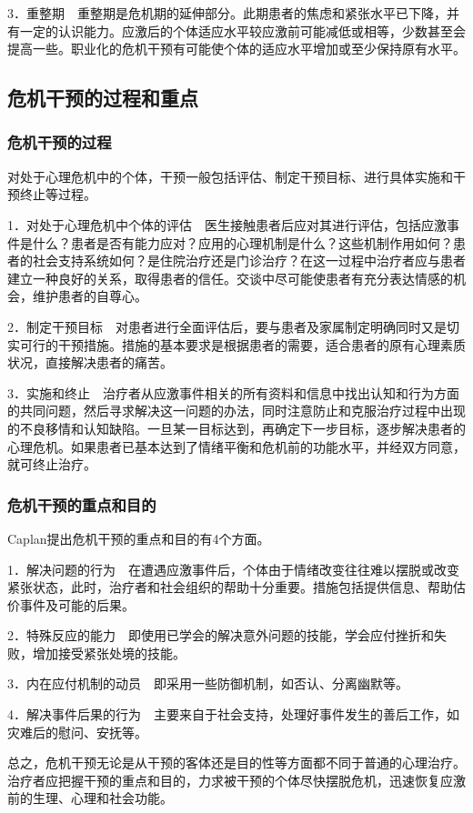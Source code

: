3．重整期　重整期是危机期的延伸部分。此期患者的焦虑和紧张水平已下降，并有一定的认识能力。应激后的个体适应水平较应激前可能减低或相等，少数甚至会提高一些。职业化的危机干预有可能使个体的适应水平增加或至少保持原有水平。

\subsection{危机干预的过程和重点}

\subsubsection{危机干预的过程}

对处于心理危机中的个体，干预一般包括评估、制定干预目标、进行具体实施和干预终止等过程。

1．对处于心理危机中个体的评估　医生接触患者后应对其进行评估，包括应激事件是什么？患者是否有能力应对？应用的心理机制是什么？这些机制作用如何？患者的社会支持系统如何？是住院治疗还是门诊治疗？在这一过程中治疗者应与患者建立一种良好的关系，取得患者的信任。交谈中尽可能使患者有充分表达情感的机会，维护患者的自尊心。

2．制定干预目标　对患者进行全面评估后，要与患者及家属制定明确同时又是切实可行的干预措施。措施的基本要求是根据患者的需要，适合患者的原有心理素质状况，直接解决患者的痛苦。

3．实施和终止　治疗者从应激事件相关的所有资料和信息中找出认知和行为方面的共同问题，然后寻求解决这一问题的办法，同时注意防止和克服治疗过程中出现的不良移情和认知缺陷。一旦某一目标达到，再确定下一步目标，逐步解决患者的心理危机。如果患者已基本达到了情绪平衡和危机前的功能水平，并经双方同意，就可终止治疗。

\subsubsection{危机干预的重点和目的}

Caplan提出危机干预的重点和目的有4个方面。

1．解决问题的行为　在遭遇应激事件后，个体由于情绪改变往往难以摆脱或改变紧张状态，此时，治疗者和社会组织的帮助十分重要。措施包括提供信息、帮助估价事件及可能的后果。

2．特殊反应的能力　即使用已学会的解决意外问题的技能，学会应付挫折和失败，增加接受紧张处境的技能。

3．内在应付机制的动员　即采用一些防御机制，如否认、分离幽默等。

4．解决事件后果的行为　主要来自于社会支持，处理好事件发生的善后工作，如灾难后的慰问、安抚等。

总之，危机干预无论是从干预的客体还是目的性等方面都不同于普通的心理治疗。治疗者应把握干预的重点和目的，力求被干预的个体尽快摆脱危机，迅速恢复应激前的生理、心理和社会功能。


\protect\hypertarget{text00020.html}{}{}

